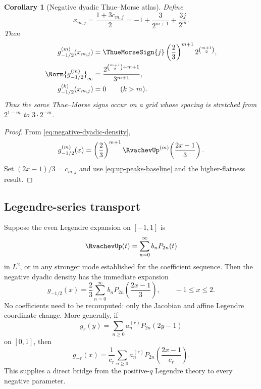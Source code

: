 \documentclass[11pt]{article}
\newtheorem{corollary}[theorem]{Corollary}
\theoremstyle{definition}
\begin{document}
\begin{corollary}[Negative dyadic Thue--Morse atlas]\label{cor:negative-thue-morse}
Define
\begin{equation}
 x_{m,j}=\frac{1+3c_{m,j}}2
 =-1+\frac{3}{2^{m+1}}+\frac{3j}{2^m}.                    \label{eq:xmj}
\end{equation}
Then
\begin{align}
 g_{-1/2}^{(m)}(x_{m,j})
 &=\ThueMorseSign{j}
   \left(\frac23\right)^{m+1}2^{\binom{m+1}{2}},          \label{eq:negative-peak-values}\\
 \Norm{g_{-1/2}^{(m)}}_\infty
 &=\frac{2^{\binom{m+1}{2}+m+1}}{3^{m+1}},               \label{eq:negative-peak-norm}\\
 g_{-1/2}^{(k)}(x_{m,j})&=0\qquad(k>m).                   \label{eq:negative-flatness}
\end{align}
Thus the same Thue--Morse signs occur on a grid whose spacing is stretched from
\(2^{1-m}\) to \(3\cdot2^{-m}\).
\end{corollary}

\begin{proof}
From \cref{eq:negative-dyadic-density},
\[
 g_{-1/2}^{(m)}(x)=\left(\frac23\right)^{m+1}
 \RvachevUp^{(m)}\!\left(\frac{2x-1}{3}\right).
\]
Set \((2x-1)/3=c_{m,j}\) and use \cref{eq:up-peaks-baseline} and the higher-flatness
result.
\end{proof}

\subsection{Legendre-series transport}

Suppose the even Legendre expansion on \([-1,1]\) is
\begin{equation}
 \RvachevUp(t)=\sum_{n=0}^{\infty}b_nP_{2n}(t)                   \label{eq:up-legendre}
\end{equation}
in \(L^2\), or in any stronger mode established for the coefficient sequence.  Then the
negative dyadic density has the immediate expansion
\begin{equation}
 \boxed{
 g_{-1/2}(x)=\frac23\sum_{n=0}^{\infty}
 b_nP_{2n}\!\left(\frac{2x-1}{3}\right),
 \qquad -1\le x\le2.}                                    \label{eq:negative-legendre}
\end{equation}
No coefficients need to be recomputed: only the Jacobian and affine Legendre coordinate
change.  More generally, if
\[
 g_r(y)=\sum_{n\ge0}a_n^{(r)}P_{2n}(2y-1)
\]
on \([0,1]\), then
\begin{equation}
 g_{-r}(x)=\frac1{c_r}\sum_{n\ge0}a_n^{(r)}
 P_{2n}\!\left(\frac{2x-1}{c_r}\right).                  \label{eq:general-negative-legendre}
\end{equation}
This supplies a direct bridge from the positive-$q$ Legendre theory to every negative
parameter.
\end{document}
